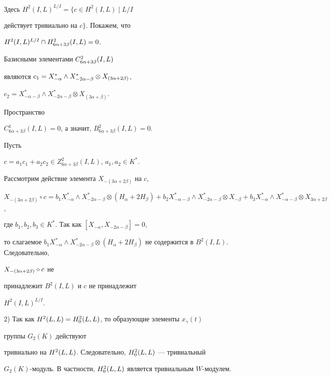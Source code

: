 \begin{pf}
Здесь $H^2(I,L)^{L/I}=\{c\in H^2(I,L) \mid L/I$ 


действует тривиально на $c\}$. Покажем, что


$H^2(I,L)^{L/I}\cap H_{6\alpha+3\beta}^2(I,L)=0$. 


Базисными элементами $C^2_{6\alpha+3\beta}(I,L)$ 


являются $c_1=X^*_{-\alpha}\wedge X^*_{-2\alpha-\beta}\otimes X_{(3\alpha+2\beta)}$, 


$c_2=X^*_{-\alpha-\beta}\wedge X^*_{-2\alpha-\beta}


\otimes X_{(3\alpha+\beta)}$.


Пространство 


$C^1_{6\alpha +3\beta}(I,L)=0$, а значит, $B^2_{6\alpha +3\beta}(I,L)=0$.


Пусть 


$c=a_1c_1+a_2c_2\in Z^2_{6\alpha+3\beta}(I,L)$, $a_1,a_2\in K^*$. 


Рассмотрим действие элемента $X_{-(3\alpha+2\beta)}$ на $c$, 


$X_{-(3\alpha+2\beta)}\circ c=b_1X^*_{-\alpha}\wedge 


X^*_{-2\alpha-\beta}\otimes(H_\alpha+2H_\beta)+b_2X^*_{-\alpha-\beta} 


\wedge X^*_{-2\alpha-\beta}\otimes X_{-\beta}+b_3 


X^*_{-\alpha}\wedge X^*_{-\alpha-\beta}\otimes 


X_{3\alpha+2\beta}$, 


где $b_1,b_2,b_3\in K^*$. Так как $[X_{-\alpha},X_{-2\alpha-\beta}]=0$, 


то слагаемое $b_1X^*_{-\alpha}\wedge X^*_{-2\alpha-\beta}\otimes 


(H_\alpha+2H_\beta)$ не содержится в $B^2(I,L)$. Следовательно,


$X_{-(3\alpha+2\beta)} \circ c$ не 


принадлежит $B^2(I,L)$ и $c$ не принадлежит 


$H^2(I,L)^{L/I}$. 


 


2) Так как $H^2(L,L)=H^2_0(L,L)$, то образующие элементы $x_{\gamma}(t)$ 


группы $G_2(K)$ действуют 


тривиально на $H^2(L,L)$. Следовательно, $H^2_0(L,L)$ --- тривиальный 


$G_{2}(K)$-модуль. В частности, $H^2_0(L,L)$ является тривиальным $W$-модулем. 


\end{pf} 


